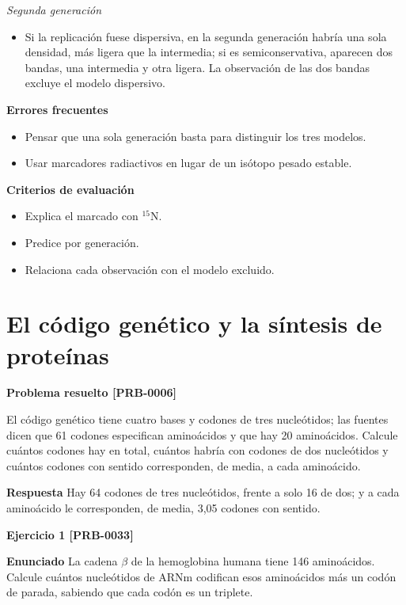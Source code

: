 \documentclass{book}
\begin{document}
\noindent\textit{Segunda generación}
\begin{itemize}
\item Si la replicación fuese dispersiva, en la segunda generación habría una sola densidad, más ligera que la intermedia; si es semiconservativa, aparecen dos bandas, una intermedia y otra ligera. La observación de las dos bandas excluye el modelo dispersivo.
\end{itemize}

\noindent\textbf{Errores frecuentes}
\begin{itemize}
\item Pensar que una sola generación basta para distinguir los tres modelos.
\item Usar marcadores radiactivos en lugar de un isótopo pesado estable.
\end{itemize}

\noindent\textbf{Criterios de evaluación}
\begin{itemize}
\item Explica el marcado con \({}^{15}\)N.
\item Predice por generación.
\item Relaciona cada observación con el modelo excluido.
\end{itemize}

\section{El código genético y la síntesis de proteínas}

\noindent\textbf{Problema resuelto [PRB-0006]}

El código genético tiene cuatro bases y codones de tres nucleótidos; las fuentes dicen que 61 codones especifican aminoácidos y que hay 20 aminoácidos. Calcule cuántos codones hay en total, cuántos habría con codones de dos nucleótidos y cuántos codones con sentido corresponden, de media, a cada aminoácido.


\noindent\textbf{Respuesta}
Hay 64 codones de tres nucleótidos, frente a solo 16 de dos; y a cada aminoácido le corresponden, de media, 3,05 codones con sentido.


\noindent\textbf{Ejercicio 1 [PRB-0033]}

\noindent\textbf{Enunciado}
La cadena \(\beta\) de la hemoglobina humana tiene 146 aminoácidos. Calcule cuántos nucleótidos de ARNm codifican esos aminoácidos más un codón de parada, sabiendo que cada codón es un triplete.
\end{document}
